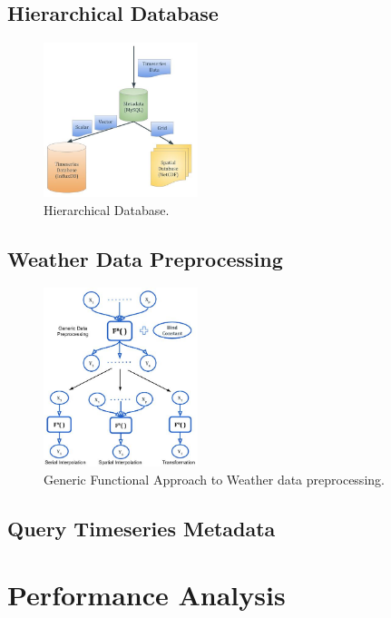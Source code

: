 \documentclass[conference]{IEEEtran}
\begin{document}
\subsection{Hierarchical Database}
\begin{figure}[htbp]
\centerline{\includegraphics[width=0.4\textwidth]{method/microservice/hierarchical_database.jpg}}
\caption{Hierarchical Database.}
\label{fi:hierarchical_database}
\end{figure}

\subsection{Weather Data Preprocessing}
\begin{figure}[htbp]
\centerline{\includegraphics[width=0.4\textwidth]{method/data_preprocess/summary_weather_data_preprocessing.jpg}}
\caption{Generic Functional Approach to Weather data preprocessing.}
\label{fi:summary_weather_data_preprocessing}
\end{figure}

\subsection{Query Timeseries Metadata}


\section{Performance Analysis}
\end{document}
